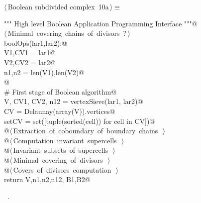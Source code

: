 \documentclass[11pt,oneside]{article}	%
\begin{document}
\begin{flushleft} \small \label{scrap16}
\protect{}$\langle\,$Boolean subdivided complex\nobreak\ {\footnotesize 10a}$\,\rangle\equiv$
\vspace{-1ex}
\begin{list}{}{} \item
\mbox{}\verb@""" High level Boolean Application Programming Interface """@\\
\mbox{}\verb@@\hbox{$\langle\,$Minimal covering chains of divisors\nobreak\ {\footnotesize ?}$\,\rangle$}\verb@@\\
\mbox{}\verb@def boolOps(lar1,lar2):@\\
\mbox{}\verb@   V1,CV1 = lar1@\\
\mbox{}\verb@   V2,CV2 = lar2@\\
\mbox{}\verb@   n1,n2 = len(V1),len(V2)@\\
\mbox{}\verb@   @\\
\mbox{}\verb@   # First stage of Boolean algorithm@\\
\mbox{}\verb@   V, CV1, CV2, n12 = vertexSieve(lar1, lar2)@\\
\mbox{}\verb@   CV = Delaunay(array(V)).vertices@\\
\mbox{}\verb@   setCV = set([tuple(sorted(cell)) for cell in CV])@\\
\mbox{}\verb@   @\hbox{$\langle\,$Extraction of coboundary of boundary chains\nobreak\ {\footnotesize {}}$\,\rangle$}\verb@@\\
\mbox{}\verb@   @\hbox{$\langle\,$Computation invariant supercells\nobreak\ {\footnotesize {}}$\,\rangle$}\verb@@\\
\mbox{}\verb@   @\hbox{$\langle\,$Invariant subsets of supercells\nobreak\ {\footnotesize {}}$\,\rangle$}\verb@@\\
\mbox{}\verb@   @\hbox{$\langle\,$Minimal covering of divisors\nobreak\ {\footnotesize {}}$\,\rangle$}\verb@@\\
\mbox{}\verb@   @\hbox{$\langle\,$Covers of divisors computation\nobreak\ {\footnotesize {}}$\,\rangle$}\verb@@\\
\mbox{}\verb@   return V,n1,n2,n12, B1,B2@\\
\mbox{}\verb@@{\NWsep}
\end{list}
\vspace{-1ex}
\footnotesize\addtolength{\baselineskip}{-1ex}
\begin{list}{}{\setlength{\itemsep}{-\parsep}\setlength{\itemindent}{-\leftmargin}}
\item \NWtxtMacroRefIn\ .
\end{list}
\end{flushleft}
\end{document}
